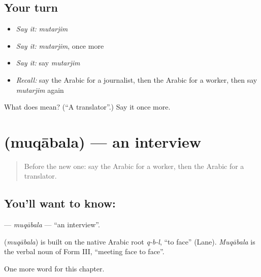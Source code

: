 \subsection*{Your turn}
\begin{itemize}
\raggedright
  \item \emph{Say it:} \emph{mutarjim}
  \item \emph{Say it:} \emph{mutarjim}, once more
  \item \emph{Say it:} say \emph{mutarjim}
  \item \emph{Recall:} say the Arabic for a journalist, then the Arabic for a worker, then say \emph{mutarjim} again
\end{itemize}

\begin{tcolorbox}[breakable,colback=teal!4,colframe=teal!35!black,title={Before you move on}]
What does  mean? (\textquotedblleft{}A translator\textquotedblright{}.) Say it once more.
\end{tcolorbox}
\section[\texorpdfstring{\ar{مقابلة} (muqābala)}{مقابلة (muqābala)}]{ (muqābala) — an interview}

\label{lesson:AR-C189-muqabala}



\begin{quote}
Before the new one: say the Arabic for a worker, then the Arabic for a translator.
\end{quote}

\subsection*{You'll want to know: }
\textbf{} — \emph{muqābala} — \textquotedblleft{}an interview\textquotedblright{}.

\begin{cousinweb}
\textbf{} (\emph{muqābala}) is built on the native Arabic root \emph{q-b-l}, \textquotedblleft{}to face\textquotedblright{} (Lane). \emph{Muqābala} is the verbal noun of Form III, \textquotedblleft{}meeting face to face\textquotedblright{}.
\end{cousinweb}

\begin{grammarlens}[title={What you've built}]
One more word for this chapter.
\end{grammarlens}

